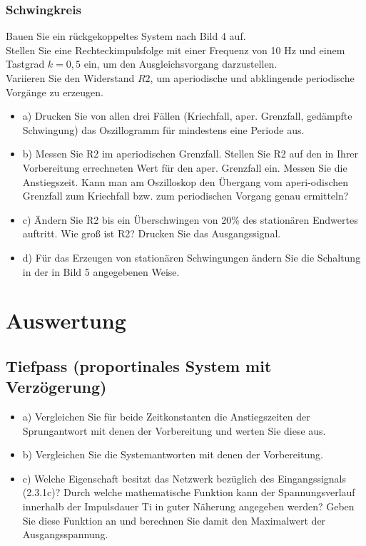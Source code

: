 \subsubsection{Schwingkreis}
Bauen Sie ein rückgekoppeltes System nach Bild 4 auf.\\
Stellen Sie eine Rechteckimpulsfolge mit einer Frequenz von 10 Hz und einem Tastgrad $k = 0,5$ ein, um den Ausgleichsvorgang darzustellen.\\ 
Variieren Sie den Widerstand $R2$, um aperiodische und abklingende periodische Vorgänge zu erzeugen.\\
\begin{itemize}
\item 	a) Drucken Sie von allen drei Fällen (Kriechfall, aper. Grenzfall, gedämpfte Schwingung) das Oszillogramm für mindestens eine Periode aus. 
\item	b) Messen Sie R2 im aperiodischen Grenzfall. Stellen Sie R2 auf den in Ihrer Vorbereitung errechneten Wert für den aper. Grenzfall ein.
Messen Sie die Anstiegszeit. Kann man am Oszilloskop den Übergang vom aperi-odischen Grenzfall zum Kriechfall bzw. zum periodischen 
Vorgang genau ermitteln? 
\item 	c) Ändern Sie R2 bis ein Überschwingen von 20\% des stationären Endwertes auftritt. 
Wie groß ist R2? Drucken Sie das Ausgangssignal. 
\item	d) Für das Erzeugen von stationären Schwingungen ändern Sie die Schaltung in der in Bild 5 angegebenen Weise. 
\end{itemize}
\section{Auswertung}
\subsection{Tiefpass (proportinales System mit Verzögerung)}
\begin{itemize}
\item a) Vergleichen  Sie  für  beide  Zeitkonstanten die  Anstiegszeiten der Sprungantwort mit denen der Vorbereitung und werten Sie diese aus. 
\item b) Vergleichen Sie die Systemantworten mit denen der Vorbereitung. 
\item c) Welche Eigenschaft besitzt das Netzwerk bezüglich des Eingangssignals (2.3.1c)? Durch welche mathematische Funktion kann der Spannungsverlauf 
innerhalb der Impulsdauer Ti in guter Näherung angegeben werden? Geben Sie diese Funktion an und berechnen Sie damit den Maximalwert der Ausgangsspannung. 
\end{itemize}
